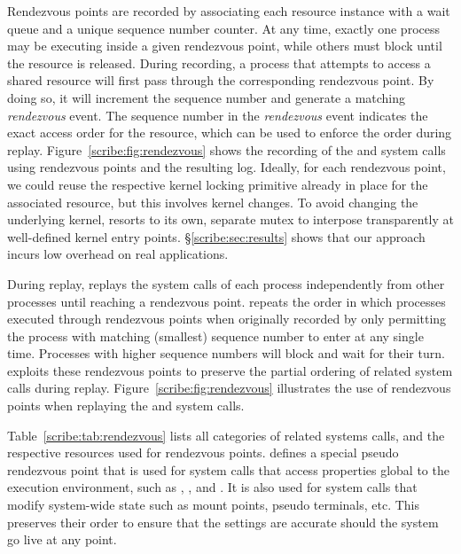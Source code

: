   

Rendezvous points are recorded by associating each resource instance 
with a wait queue and a unique sequence number counter. At
any time, exactly one process may be executing inside a given
rendezvous point, while others must block until the resource is
released.  During recording, a process that attempts to access a
shared resource will first pass through the corresponding rendezvous
point.  By doing so, it will increment the sequence number and
generate a matching {\em rendezvous} event. The sequence number in the
{\em rendezvous} event indicates the exact access order for the
resource, which can be used to enforce the order during replay.
Figure~\ref{scribe:fig:rendezvous} shows the recording of
the  and  system calls using rendezvous points
and the resulting log. 
Ideally, for each rendezvous point, we could reuse the respective
kernel locking primitive already in place for the associated
resource, but this involves kernel changes.  To avoid changing the
underlying kernel, \scribe{} resorts to its own, separate mutex to
interpose transparently at well-defined kernel entry points.
\S\ref{scribe:sec:results} shows that our approach incurs low overhead
on real applications. 

During replay, \scribe{} replays the system calls of each process
independently from other processes until reaching a rendezvous point.
\scribe{} repeats the order in which processes executed through
rendezvous points when originally recorded by only permitting the
process with matching (smallest) sequence number to enter at any
single time. Processes with higher sequence numbers will block and
wait for their turn.  \scribe{} exploits these rendezvous points to
preserve the partial ordering of related system calls during replay.
Figure~\ref{scribe:fig:rendezvous} illustrates the use of rendezvous points
when replaying the  and  system calls.

  

Table~\ref{scribe:tab:rendezvous} lists all categories of related systems
calls, and the respective resources used for rendezvous points.
\scribe{} defines a special pseudo rendezvous point that
is used for system calls that access properties global to the
execution environment, such as , , and
. It is also used for system calls that modify
system-wide state such as mount points, pseudo terminals, etc.  This
preserves their order to ensure that the settings are accurate should
the system go live at any point.

